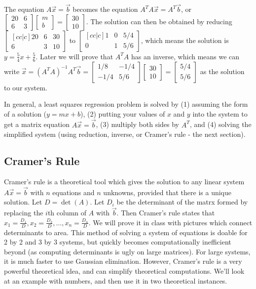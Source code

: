 \documentclass[10pt]{article}
\begin{document}
The equation $A\vec x = \vec b$ becomes the equation $A^T A \vec x = A^T\vec b$, or $\begin{bmatrix}20&6\\6&3\end{bmatrix} \begin{bmatrix}m\\b\end{bmatrix}=\begin{bmatrix}30\\10\end{bmatrix}$. The solution can then be obtained by reducing $\begin{bmatrix}[cc|c]20&6&30\\6&3&10\end{bmatrix}$ to $\begin{bmatrix}[cc|c]1&0&5/4\\0&1&5/6\end{bmatrix}$, which means the solution is $y=\frac{5}{4}x+\frac{5}{6}.$  Later we will prove that $A^T A$ has an inverse, which means we can write $\vec x = (A^T A)^{-1}A^T \vec b = \begin{bmatrix}1/8&-1/4\\-1/4&5/6\end{bmatrix}\begin{bmatrix}30\\10\end{bmatrix} = \begin{bmatrix}5/4\\5/6\end{bmatrix} $ as the solution to our system. 

In general, a least squares regression problem is solved by (1) assuming the form of a solution ($y=mx+b$), (2) putting your values of $x$ and $y$ into the system to get a matrix equation $A\vec x=\vec b$, (3) multiply both sides by $A^T$, and (4) solving the simplified system (using reduction, inverse, or Cramer's rule - the next section).  

\subsection{Cramer's Rule}

Cramer's rule is a theoretical tool which gives the solution to any linear system $A\vec x = \vec b$ with $n$ equations and $n$ unknowns, provided that there is a unique solution.  Let $D=\det(A)$. Let $D_i$ be the determinant of the matrx formed by replacing the $i$th column of $A$ with $\vec b$.  Then Cramer's rule states that $x_1 = \frac{D_1}{D},x_2 = \frac{D_2}{D},\ldots, x_n = \frac{D_n}{D}$. We will prove it in class with pictures which connect determinants to area. This method of solving a system of equations is doable for 2 by 2 and 3 by 3 systems, but quickly becomes computationally inefficient beyond (as computing determinants is ugly on large matrices). For large systems, it is much faster to use Gaussian elimination.  However, Cramer's rule is a very powerful theoretical idea, and can simplify theoretical computations. We'll look at an example with numbers, and then use it in two theoretical instances.
\end{document}

